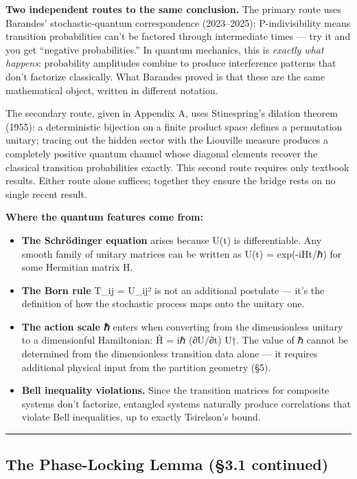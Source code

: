 \documentclass[
]{article}
\begin{document}
\textbf{Two independent routes to the same conclusion.} The primary
route uses Barandes' stochastic-quantum correspondence (2023--2025):
P-indivisibility means transition probabilities can't be factored
through intermediate times --- try it and you get ``negative
probabilities.'' In quantum mechanics, this is \emph{exactly what
happens}: probability amplitudes combine to produce interference
patterns that don't factorize classically. What Barandes proved is that
these are the same mathematical object, written in different notation.

The secondary route, given in Appendix A, uses Stinespring's dilation
theorem (1955): a deterministic bijection on a finite product space
defines a permutation unitary; tracing out the hidden sector with the
Liouville measure produces a completely positive quantum channel whose
diagonal elements recover the classical transition probabilities
exactly. This second route requires only textbook results. Either route
alone suffices; together they ensure the bridge rests on no single
recent result.

\textbf{Where the quantum features come from:}

\begin{itemize}
\item
  \textbf{The Schrödinger equation} arises because U(t) is
  differentiable. Any smooth family of unitary matrices can be written
  as U(t) = exp(-iHt/ℏ) for some Hermitian matrix H.
\item
  \textbf{The Born rule} T\_ij = \textbar U\_ij\textbar² is not an
  additional postulate --- it's the definition of how the stochastic
  process maps onto the unitary one.
\item
  \textbf{The action scale ℏ} enters when converting from the
  dimensionless unitary to a dimensionful Hamiltonian: Ĥ = iℏ (∂U/∂t)
  U†. The value of ℏ cannot be determined from the dimensionless
  transition data alone --- it requires additional physical input from
  the partition geometry (§5).
\item
  \textbf{Bell inequality violations.} Since the transition matrices for
  composite systems don't factorize, entangled systems naturally produce
  correlations that violate Bell inequalities, up to exactly Tsirelson's
  bound.
\end{itemize}

\begin{center}\rule{0.5\linewidth}{0.5pt}\end{center}

\hypertarget{the-phase-locking-lemma-3.1-continued}{%
\subsection{The Phase-Locking Lemma (§3.1
continued)}\label{the-phase-locking-lemma-3.1-continued}}
\end{document}
